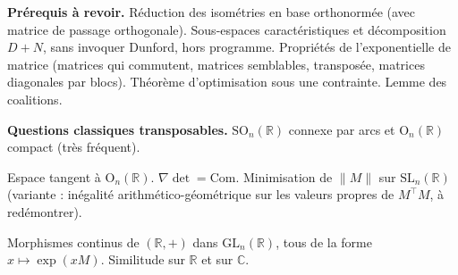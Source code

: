 \documentclass[11pt,a4paper]{article}
\begin{document}
\textbf{Prérequis à revoir.} Réduction des isométries en base orthonormée (avec matrice de passage orthogonale). Sous-espaces caractéristiques et décomposition \(D+N\), sans invoquer Dunford, hors programme. Propriétés de l'exponentielle de matrice (matrices qui commutent, matrices semblables, transposée, matrices diagonales par blocs). Théorème d'optimisation sous une contrainte. Lemme des coalitions.

\textbf{Questions classiques transposables.} \({\mathrm{SO}}_n(\mathbb R)\) connexe par arcs et \({\mathrm{O}}_n(\mathbb R)\) compact (très fréquent).

Espace tangent à \({\mathrm{O}}_n(\mathbb R)\). \(\nabla\det=\mathrm{Com}\). Minimisation de \(\|M\|\) sur \({\mathrm{SL}}_n(\mathbb R)\) (variante : inégalité arithmético-géométrique sur les valeurs propres de \(M^\top M\), à redémontrer).

Morphismes continus de \((\mathbb R,+)\) dans \({\mathrm{GL}}_n(\mathbb R)\), tous de la forme \(x\mapsto\exp(xM)\). Similitude sur \(\mathbb R\) et sur \(\mathbb C\).
\end{document}

